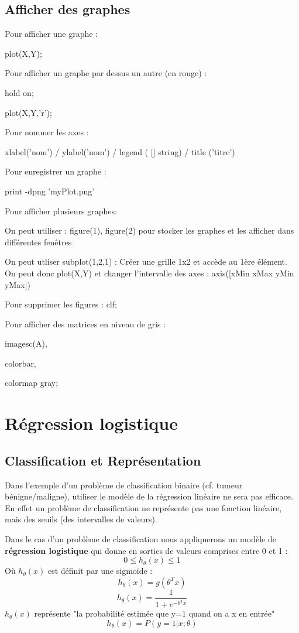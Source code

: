 \documentclass{article}
\theoremstyle{definition}
\begin{document}
\subsection{Afficher des graphes}
Pour afficher une graphe : 
\begin{center}
plot(X,Y);
\end{center}
Pour afficher un graphe par dessus un autre (en rouge) :
\begin{center}
hold on;\par
plot(X,Y,'r');
\end{center}
Pour nommer les axes : 
\begin{center}
xlabel('nom') / ylabel('nom') / legend ( [] string) / title ('titre')
\end{center}
Pour enregistrer un graphe : 
\begin{center}
print -dpng 'myPlot.png'
\end{center}
Pour afficher plusieurs graphes:
\begin{center}
On peut utiliser : figure(1), figure(2) pour stocker les graphes et les afficher dans différentes fenêtres \par
On peut utliser subplot(1,2,1) : Créer une grille 1x2 et accède au 1ère élément. On peut donc plot(X,Y) et changer l'intervalle des axes : axis([xMin xMax yMin yMax])\par
Pour supprimer les figures : clf;
\end{center}
Pour afficher des matrices en niveau de gris : 
\begin{center}
imagesc(A),\par
colorbar,\par
colormap gray;
\end{center}
\newpage
\section{Régression logistique}
\subsection{Classification et Représentation}
Dans l'exemple d'un problème de classification binaire (cf. tumeur bénigne/maligne), utiliser le modèle de la régression linéaire ne sera pas efficace. En effet un problème de classification ne représente pas une fonction linéaire, mais des seuils (des intervalles de valeurs).\par
Dans le cas d'un problème de classification nous appliquerons un modèle de \textbf{régression logistique} qui donne en sorties de valeurs comprises entre 0 et 1 :
\begin{equation}
0\leq h_\theta(x)\leq 1
\end{equation}
Où $ h_\theta(x)$ est définit par une sigmoïde :
\begin{equation}
h_\theta(x)=g(\theta^{T}x)
\end{equation}
\begin{equation}
h_\theta(x)= \frac{1}{1+e^{-\theta^{T}x}}
\end{equation}
$h_\theta(x)$ représente "la probabilité estimée que y=1 quand on a x en entrée"
\begin{equation}
h_\theta(x)= P(y=1|x;\theta)
\end{equation}
\end{document}
